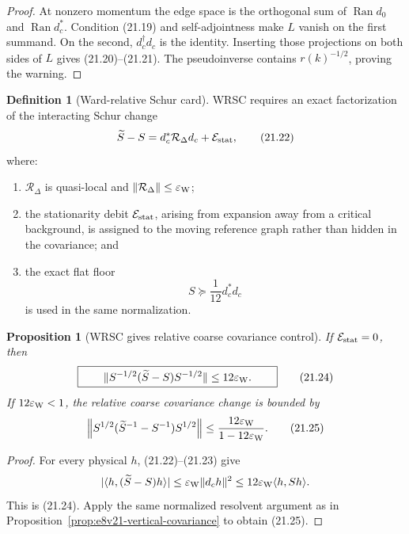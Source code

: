 \documentclass[11pt,oneside]{book}
\newtheorem{proposition}[theorem]{Proposition}
\theoremstyle{definition}
\newtheorem{definition}[theorem]{Definition}
\theoremstyle{remark}
\begin{document}
\begin{proof}
At nonzero momentum the edge space is the orthogonal sum of
\(\operatorname{Ran}d_0\) and \(\operatorname{Ran}d_c^*\).
Condition (21.19) and self-adjointness make \(L\) vanish on the first
summand.  On the second, \(d_c^\dagger d_c\) is the identity.
Inserting those projections on both sides of \(L\) gives
(21.20)--(21.21).  The pseudoinverse contains \(r(k)^{-1/2}\), proving
the warning.
\end{proof}

\begin{definition}[Ward-relative Schur card]
\label{def:e8v21-wrsc}
WRSC requires an exact factorization of the interacting Schur change
\[
 \widetilde S-S=d_c^*\mathcal R_{\Delta}d_c
                 +\mathcal E_{\rm stat},                           \tag{21.22}
\]
where:
\begin{enumerate}
\item \(\mathcal R_\Delta\) is quasi-local and
\(\|\mathcal R_\Delta\|\leq\varepsilon_{\rm W}\);
\item the stationarity debit \(\mathcal E_{\rm stat}\), arising from
expansion away from a critical background, is assigned to the moving
reference graph rather than hidden in the covariance; and
\item the exact flat floor
\[
                         S\succeq\frac1{12}d_c^*d_c                 \tag{21.23}
\]
is used in the same normalization.
\end{enumerate}
\end{definition}

\begin{proposition}[WRSC gives relative coarse covariance control]
\label{prop:e8v21-WRSC}
If \(\mathcal E_{\rm stat}=0\), then
\[
\boxed{\qquad
\|S^{-1/2}(\widetilde S-S)S^{-1/2}\|
\leq12\varepsilon_{\rm W}.
\qquad}                                                           \tag{21.24}
\]
If \(12\varepsilon_{\rm W}<1\), the relative coarse covariance change
is bounded by
\[
 \left\|S^{1/2}(\widetilde S^{-1}-S^{-1})S^{1/2}\right\|
\leq\frac{12\varepsilon_{\rm W}}
          {1-12\varepsilon_{\rm W}}.               \tag{21.25}
\]
\end{proposition}

\begin{proof}
For every physical \(h\), (21.22)--(21.23) give
\[
 |\langle h,(\widetilde S-S)h\rangle|
\leq\varepsilon_{\rm W}\|d_ch\|^2
\leq12\varepsilon_{\rm W}\langle h,Sh\rangle.
\]
This is (21.24).  Apply the same normalized resolvent argument as in
Proposition~\ref{prop:e8v21-vertical-covariance} to obtain (21.25).
\end{proof}
\end{document}

